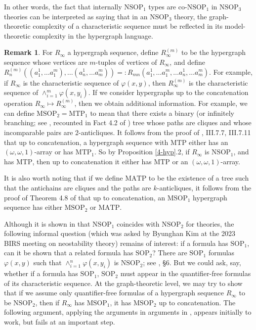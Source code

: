\documentclass[12pt]{amsart}
\theoremstyle{definition}
\newtheorem{remark}[theorem]{Remark}
\begin{document}
In other words, the fact that internally $\mathrm{NSOP}_{1}$ types are co-$\mathrm{NSOP}_{1}$ in $\mathrm{NSOP}_{3}$ theories can be interpreted as saying that in an $\mathrm{NSOP}_{3}$ theory, the graph-theoretic complexity of a characteristic sequence must be reflected in its model-theoretic complexity in the hypergraph language.

\begin{remark}
    For $R_{\infty}$ a hypergraph sequence, define $R^{(m)}_{\infty}$ to be the hypergraph sequence whose vertices are $m$-tuples of vertices of $R_{\infty}$, and define $R_{n}^{(m)}((a^{1}_{1}, \ldots a^{m}_{1}), \ldots (a^{1}_{n}, \ldots a^{m}_{m})) =: R_{mn}(a^{1}_{1}, \ldots a^{m}_{1}, \ldots a^{1}_{n}, \ldots a^{m}_{m})$. For example, if $R_{\infty}$ is the characteristic sequence of $\varphi(x, y)$, then $R^{(m)}_{\infty}$ is the characteristic sequence of $\wedge_{i=1}^{m} \varphi(x, y_{i})$. If we consider hypergraphs up to the concatenation operation $R_{\infty} \mapsto R^{(m)}_{\infty}$, then we obtain additional information. For example, we can define $\mathrm{MSOP}_{2}=\mathrm{MTP}_{1}$ to mean that there exists a binary (or infinitely branching; see \cite{Adl07}, recounted in Fact 4.2 of \cite{CR15}) tree whose paths are cliques and whose incomparable pairs are $2$-anticliques. It follows from the proof of \cite{Sh90}, III.7.7, III.7.11 that up to concatenation, a hypergraph sequence with $\mathrm{MTP}$ either has an $(\omega, \omega, 1)$-array or has $\mathrm{MTP}_{1}$. So by Proposition \ref{4-hyp}.2, if $R_{\infty}$ is $\mathrm{NSOP}_{1}$, and has $\mathrm{MTP}$, then up to concatenation it either has $\mathrm{MTP}$ or an $(\omega, \omega, 1)$-array.

    It is also worth noting that if we define $\mathrm{MATP}$ to be the existence of a tree such that the antichains are cliques and the paths are $k$-anticliques, it follows from the proof of Theorem 4.8 of \cite{AK20} that up to concatenation, an $\mathrm{MSOP}_{1}$ hypergraph sequence has either $\mathrm{MSOP}_{2}$ or $\mathrm{MATP}$.

    Although it is shown in \cite{NSOP2} that $\mathrm{NSOP}_{1}$ coincides with $\mathrm{NSOP}_{2}$ for theories, the following informal question (which was asked by Byunghan Kim at the 2023 BIRS meeting on neostability theory) remains of interest: if a formula has $\mathrm{SOP}_{1}$, can it be shown that a related formula has $\mathrm{SOP}_{2}$?   There are $\mathrm{SOP}_{1}$ formulas $\varphi(x, y)$ such that $\wedge_{i =1}^{n} \varphi(x, y_{i})$ is $\mathrm{NSOP}_{2}$; see \cite{AK20}, §6. But we could ask, say, whether if a formula has $\mathrm{SOP}_{1}$, $\mathrm{SOP}_{2}$ must appear in the quantifier-free formulas of its characteristic sequence. At the graph-theoretic level, we may try to show that if we assume only quantifier-free formulas of a hypergraph sequence $R_{\infty}$ to be $\mathrm{NSOP}_{2}$, then if $R_{\infty}$ has $\mathrm{MSOP}_{1}$, it has $\mathrm{MSOP}_{2}$ up to concatenation. The following argument, applying the arguments in arguments in \cite{NSOP2}, appears initially to work, but fails at an important step.
    

\end{remark}
\end{document}
